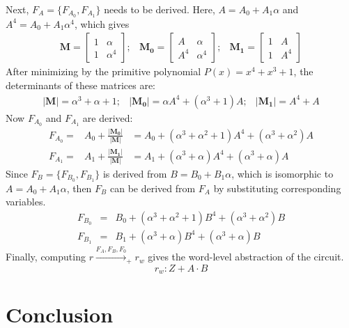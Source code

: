 \begin{Example}
Next, $F_A=\{F_{A_0},F_{A_1}\}$ needs to be derived. Here, $A=A_0+A_1\alpha$ and $A^{4}=A_0+A_1\alpha^4$,
which gives
\begin{eqnarray}
\mathbf{M}=
\begin{bmatrix}
1 & \alpha \\
1 & \alpha^4
\end{bmatrix}; &
\mathbf{M_0}=
\begin{bmatrix}
A & \alpha \\
A^4 & \alpha^4
\end{bmatrix}; &
\mathbf{M_1}=
\begin{bmatrix}
1 & A \\
1 & A^4
\end{bmatrix}
\end{eqnarray}
After minimizing by the primitive polynomial $P(x)=x^4+x^3+1$, 
the determinants of these matrices are:
\begin{eqnarray}
|\mathbf{M}|=\alpha^3+\alpha+1; &
|\mathbf{M_0}|=\alpha A^4+(\alpha^3+1)A; &
|\mathbf{M_1}|=A^4+A
\end{eqnarray}
Now $F_{A_0}$ and $F_{A_1}$ are derived:
\begin{eqnarray}
F_{A_0} = &A_0+\frac{|\mathbf{M_0}|}{|\mathbf{M}|}& = A_0+(\alpha^3+\alpha^2+1)A^4+(\alpha^3+\alpha^2)A \\
F_{A_1} = &A_1+\frac{|\mathbf{M_1}|}{|\mathbf{M}|}& = A_1+(\alpha^3+\alpha)A^4+(\alpha^3+\alpha)A
\end{eqnarray}
Since $F_B=\{F_{B_0},F_{B_1}\}$ is derived from $B=B_0+B_1\alpha$, which is isomorphic to
$A=A_0+A_1\alpha$, then $F_B$ can be derived from $F_A$ by substituting corresponding
variables.
\begin{eqnarray}
F_{B_0}& = &B_0+(\alpha^3+\alpha^2+1)B^4+(\alpha^3+\alpha^2)B \\
F_{B_1}& = &B_1+(\alpha^3+\alpha)B^4+(\alpha^3+\alpha)B
\end{eqnarray}
Finally, computing $r\xrightarrow{F_A,F_B,F_0}_+ r_w$ gives the word-level abstraction of
the circuit.
\begin{equation}
r_w: Z+A\cdot B
\end{equation}


\end{Example}

\section{Conclusion}

